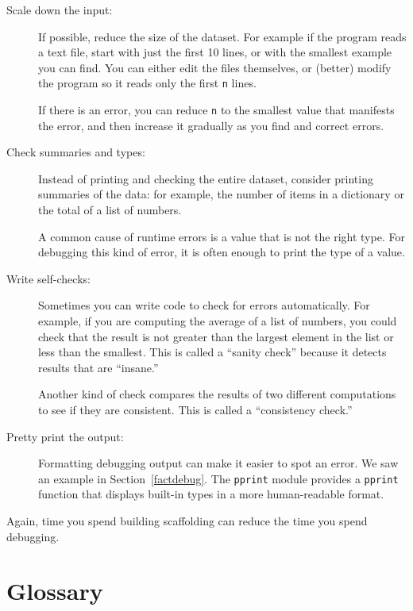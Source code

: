 \documentclass[10pt]{book}
\begin{document}
\begin{description}

\item[Scale down the input:] If possible, reduce the size of the
dataset.  For example if the program reads a text file, start with
just the first 10 lines, or with the smallest example you can find.
You can either edit the files themselves, or (better) modify the
program so it reads only the first {\tt n} lines.

If there is an error, you can reduce {\tt n} to the smallest
value that manifests the error, and then increase it gradually
as you find and correct errors.

\item[Check summaries and types:] Instead of printing and checking the
entire dataset, consider printing summaries of the data: for example,
the number of items in a dictionary or the total of a list of numbers.

A common cause of runtime errors is a value that is not the right
type.  For debugging this kind of error, it is often enough to print
the type of a value.

\item[Write self-checks:]  Sometimes you can write code to check
for errors automatically.  For example, if you are computing the
average of a list of numbers, you could check that the result is
not greater than the largest element in the list or less than
the smallest.  This is called a ``sanity check'' because it detects
results that are ``insane.''

Another kind of check compares the results of two different
computations to see if they are consistent.  This is called a
``consistency check.''

\item[Pretty print the output:] Formatting debugging output
can make it easier to spot an error.  We saw an example in
Section~\ref{factdebug}.  The {\tt pprint} module provides
a {\tt pprint} function that displays built-in types in
a more human-readable format.

\end{description}

Again, time you spend building scaffolding can reduce
the time you spend debugging.

\section{Glossary}
\end{document}
